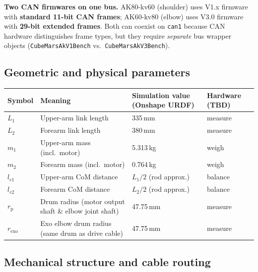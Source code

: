 \documentclass[11pt,a4paper]{article}
\newcommand{\rp}{r_{\mathrm{p}}}
\begin{document}
\begin{warnbox}
\textbf{Two CAN firmwares on one bus.}
AK80-kv60 (shoulder) uses V1.x firmware with \textbf{standard 11-bit CAN frames};
AK60-kv80 (elbow) uses V3.0 firmware with \textbf{29-bit extended frames}.
Both can coexist on \texttt{can1} because CAN hardware distinguishes frame
types, but they require \emph{separate} bus wrapper objects
(\texttt{CubeMarsAkV1Bench} vs.\ \texttt{CubeMarsAkV3Bench}).
\end{warnbox}

\subsection{Geometric and physical parameters}

\begin{center}\small
\begin{tabular}{llll}
\toprule
Symbol & Meaning & Simulation value (Onshape URDF) & Hardware (TBD) \\
\midrule
$L_1$      & Upper-arm link length          & 335\,mm & measure \\
$L_2$      & Forearm link length            & 380\,mm & measure \\
$m_1$      & Upper-arm mass (incl.\ motor)  & 5.313\,kg & weigh \\
$m_2$      & Forearm mass (incl.\ motor)    & 0.764\,kg & weigh \\
$l_{c1}$   & Upper-arm CoM distance         & $L_1/2$ (rod approx.) & balance \\
$l_{c2}$   & Forearm CoM distance           & $L_2/2$ (rod approx.) & balance \\
$\rp$      & Drum radius (motor output shaft \& elbow joint shaft)  & 47.75\,mm & measure \\
$r_{\mathrm{exo}}$ & Exo elbow drum radius (same drum as drive cable) & 47.75\,mm & measure \\
\bottomrule
\end{tabular}
\end{center}

\subsection{Mechanical structure and cable routing}
\label{sec:mech}
\end{document}
